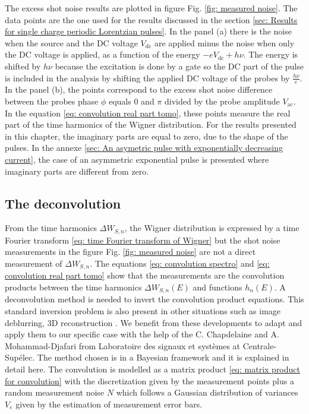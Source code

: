 The excess shot noise results are plotted in figure Fig. \ref{fig: measured noise}.
The data points are the one used for the results discussed in the section \ref{sec: Results for single charge periodic Lorentzian pulses}.
In the panel (a) there is the noise when the source and the DC voltage $V_{\mathrm{dc}}$ are applied minus the noise when only the DC voltage is applied, as a function of the energy $-eV_{\mathrm{dc}}+h\nu$.
The energy is shifted by $h\nu$ because the excitation is done by a gate so the DC part of the pulse is included in the analysis by shifting the applied DC voltage of the probes by $\frac{h\nu}{e}$.
In the panel (b), the points correspond to the excess shot noise difference between the probes phase $\phi$ equals 0 and $\pi$ divided by the probe amplitude $V_{\mathrm{ac}}$.
In the equation \eqref{eq: convolution real part tomo}, these points measure the real part of the time harmonics of the Wigner distribution.
For the results presented in this chapter, the imaginary parts are equal to zero, due to the shape of the pulses.
In the annexe \ref{sec: An asymetric pulse with exponentially decreasing current}, the case of an asymmetric exponential pulse is presented where imaginary parts are different from zero.

\subsection{The deconvolution}

From the time harmonics $\Delta W_{S,n}$, the Wigner distribution is expressed by a time Fourier transform \eqref{eq: time Fourier transform of Wigner} but the shot noise measurements in the figure Fig. \ref{fig: measured noise} are not a direct measurement of $\Delta W_{S,n}$.
The equations \eqref{eq: convolution spectro} and \eqref{eq: convolution real part tomo} show that the measurements are the convolution products between the time harmonics $\Delta W_{S,n}\left(E\right)$ and functions $h_{n}\left(E\right)$.
A deconvolution method is needed to invert the convolution product equations.
This standard inversion problem is also present in other situations such as image deblurring, 3D reconstruction \cite{chapdelaine20173d}.
We benefit from these developments to adapt and apply them to our specific case with the help of the C. Chapdelaine and A. Mohammad-Djafari from Laboratoire des signaux et systèmes at Centrale-Supélec.
The method chosen is in a Bayesian framework \cite{mohammad2015bayesian} and it is explained in detail here.
The convolution is modelled as a matrix product \eqref{eq: matrix product for convolution} with the discretization given by the measurement points plus a random measurement noise $N$ which follows a Gaussian distribution of variances $V_{e}$ given by the estimation of measurement error bars.

